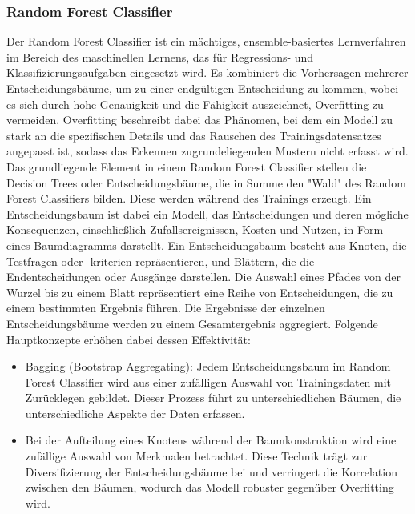 \pagebreak

\subsubsection*{Random Forest Classifier}
Der Random Forest Classifier ist ein mächtiges, ensemble-basiertes Lernverfahren im Bereich des maschinellen Lernens, das für Regressions- und Klassifizierungsaufgaben eingesetzt wird. Es kombiniert die Vorhersagen mehrerer Entscheidungsbäume, um zu einer endgültigen Entscheidung zu kommen, wobei es sich durch hohe Genauigkeit und die Fähigkeit auszeichnet, Overfitting zu vermeiden.
Overfitting beschreibt dabei das Phänomen, bei dem ein Modell zu stark an die spezifischen Details und das Rauschen des Trainingsdatensatzes angepasst ist, sodass das Erkennen zugrundeliegenden Mustern nicht erfasst wird.
Das grundliegende Element in einem Random Forest Classifier stellen die Decision Trees oder Entscheidungsbäume, die in Summe den "Wald" des Random Forest Classifiers bilden. Diese werden während des Trainings erzeugt.
Ein Entscheidungsbaum ist dabei ein Modell, das Entscheidungen und deren mögliche Konsequenzen, einschließlich Zufallsereignissen, Kosten und Nutzen, in Form eines Baumdiagramms darstellt. Ein Entscheidungsbaum besteht aus Knoten, die Testfragen oder -kriterien repräsentieren, und Blättern, die die Endentscheidungen oder Ausgänge darstellen. Die Auswahl eines Pfades von der Wurzel bis zu einem Blatt repräsentiert eine Reihe von Entscheidungen, die zu einem bestimmten Ergebnis führen.
Die Ergebnisse der einzelnen Entscheidungsbäume werden zu einem Gesamtergebnis aggregiert. Folgende Hauptkonzepte erhöhen dabei dessen Effektivität:

\begin{itemize}
    \item Bagging (Bootstrap Aggregating): Jedem Entscheidungsbaum im Random Forest Classifier wird aus einer zufälligen Auswahl von Trainingsdaten mit Zurücklegen gebildet. Dieser Prozess führt zu unterschiedlichen Bäumen, die unterschiedliche Aspekte der Daten erfassen.
    \item  Bei der Aufteilung eines Knotens während der Baumkonstruktion wird eine zufällige Auswahl von Merkmalen betrachtet. Diese Technik trägt zur Diversifizierung der Entscheidungsbäume bei und verringert die Korrelation zwischen den Bäumen, wodurch das Modell robuster gegenüber Overfitting wird.
\end{itemize}

